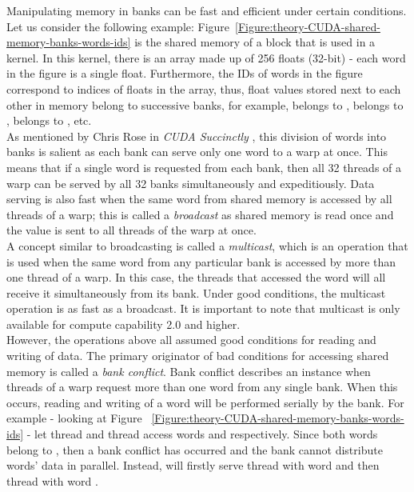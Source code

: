 Manipulating memory in banks can be fast and efficient under certain conditions. Let us consider the following example: Figure~\ref{Figure:theory-CUDA-shared-memory-banks-words-ids} is the shared memory of a block that is used in a kernel. In this kernel, there is an array made up of 256 floats (32-bit) - each word in the figure is a single float. Furthermore, the IDs of words in the figure correspond to indices of floats in the array, thus, float values stored next to each other in memory belong to successive banks, for example,  belongs to ,  belongs to ,  belongs to , etc. \\
As mentioned by Chris Rose in \emph{CUDA Succinctly} \cite{Rose2017}, this division of words into banks is salient as each bank can serve only one word to a warp at once. This means that if a single word is requested from each bank, then all 32 threads of a warp can be served by all 32 banks simultaneously and expeditiously. Data serving is also fast when the same word from shared memory is accessed by all threads of a warp; this is called a \textit{broadcast} as shared memory is read once and the value is sent to all threads of the warp at once. \\
A concept similar to broadcasting is called a \textit{multicast}, which is an operation that is used when the same word from any particular bank is accessed by more than one thread of a warp. In this case, the threads that accessed the word will all receive it simultaneously from its bank. Under good conditions, the multicast operation is as fast as a broadcast. It is important to note that multicast is only available for compute capability 2.0 and higher. \\
However, the operations above all assumed good conditions for reading and writing of data. The primary originator of bad conditions for accessing shared memory is called a \textit{bank conflict}. Bank conflict describes an instance when threads of a warp request more than one word from any single bank. When this occurs, reading and writing of a word will be performed serially by the bank. For example - looking at Figure ~\ref{Figure:theory-CUDA-shared-memory-banks-words-ids} - let thread  and thread  access words  and  respectively. Since both words belong to , then a bank conflict has occurred and the bank cannot distribute words' data in parallel. Instead,  will firstly serve thread  with word  and then thread  with word . \\
